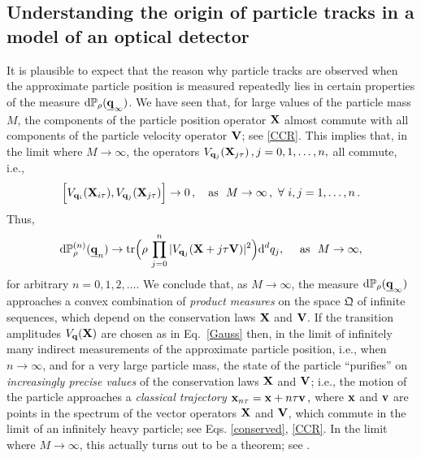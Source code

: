 \documentclass[11pt]{article}
\renewcommand{\d}{{\mathrm d}}
\begin{document}
 \subsection{Understanding the origin of particle tracks in a model of an optical detector}
 It is plausible to expect that the reason why particle tracks are observed when the approximate particle position is measured repeatedly lies in certain properties of the measure $\d\mathbb{P}_{\rho}(\underline{{\bf{q}}}_{\infty})$. We have seen that, for large values of the particle mass $M$, the components of the particle position operator ${\bf{X}}$ almost commute with all components of the particle velocity operator ${\bf{V}}$; see \eqref{CCR}. This implies that, in the limit where $M \rightarrow \infty$, the operators 
 $V_{{\bf{q}}_{j}}({\bf{X}}_{j \tau})\,, j= 0,1,\dots, n,$ all commute, i.e.,
 \begin{equation}\label{class lim}
 \Big[V_{{\bf{q}}_{i}}({\bf{X}}_{i \tau}), V_{{\bf{q}}_{j}}({\bf{X}}_{j \tau}) \Big] \rightarrow 0\,, \quad \text{as   }\,\, M\rightarrow \infty\,, \,\, \forall \,\, i,j=1,\dots, n\,.
 \end{equation}
 Thus,
 \begin{equation}\label{lim measure}
 \d\mathbb{P}^{(n)}_{\rho}(\underline{{\bf{q}}}_{n}) \rightarrow \text{tr}\Big( \rho\,\prod_{j=0}^{n} \vert V_{{\bf{q}}_j}({\bf{X}}+j\tau {\bf{V}}) \vert^{2}\Big) \d^{d} q_{j}, \quad \text{ as  }\,\, M\rightarrow \infty,
 \end{equation}
for arbitrary $n=0,1,2,\dots$. We conclude that, as $M\rightarrow \infty$, the measure 
$\d \mathbb{P}_{\rho}(\underline{{\bf{q}}}_{\infty})$ approaches a convex combination of
 \textit{product measures} on the space $\mathfrak{Q}$ of infinite sequences, which
depend on the conservation laws ${\bf{X}}$ and ${\bf{V}}$.
If the transition amplitudes $V_{{\bf{q}}}({\bf{X}})$ are chosen as in Eq.~\eqref{Gauss} then, in the limit of infinitely many indirect measurements of the approximate particle position, i.e., when $n \rightarrow \infty$, 
and for a very large particle mass, the 
state of the particle ``purifies'' on \textit{increasingly precise values} of the conservation laws ${\bf{X}}$ and $
{\bf{V}}$; i.e., the motion of the particle approaches a \textit{classical trajectory}
${\bf{x}}_{n\tau} = {\bf{x}} + n\tau {\bf{v}}\,,$ where ${\bf{x}}$ and ${\bf{v}}$ are points in the spectrum of the vector 
operators ${\bf{X}}$ and ${\bf{V}}$, which commute in the limit of an infinitely heavy particle; see Eqs. \eqref{conserved}, \eqref{CCR}. In the limit where $M \rightarrow \infty$, this actually turns out to be a theorem; see \cite{BBB, BCFFS}. 
 
\end{document}
